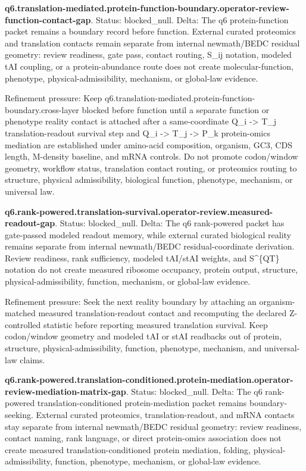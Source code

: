 \textbf{q6.translation-mediated.protein-function-boundary.operator-review-function-contact-gap}. Status: blocked\_null. Delta: The q6 protein-function packet remains a boundary record before function. External curated proteomics and translation contacts remain separate from internal newmath/BEDC residual geometry: review readiness, gate pass, contact routing, S\_ij notation, modeled tAI coupling, or a protein-abundance route does not create molecular-function, phenotype, physical-admissibility, mechanism, or global-law evidence.

Refinement pressure: Keep q6.translation-mediated.protein-function-boundary.cross-layer blocked before function until a separate function or phenotype reality contact is attached after a same-coordinate Q\_i -> T\_j translation-readout survival step and Q\_i -> T\_j -> P\_k protein-omics mediation are established under amino-acid composition, organism, GC3, CDS length, M-density baseline, and mRNA controls. Do not promote codon/window geometry, workflow status, translation contact routing, or proteomics routing to structure, physical admissibility, biological function, phenotype, mechanism, or universal law.

\textbf{q6.rank-powered.translation-survival.operator-review.measured-readout-gap}. Status: blocked\_null. Delta: The q6 rank-powered packet has gate-passed modeled readout memory, while external curated biological reality remains separate from internal newmath/BEDC residual-coordinate derivation. Review readiness, rank sufficiency, modeled tAI/stAI weights, and S\textasciicircum{}\{QT\} notation do not create measured ribosome occupancy, protein output, structure, physical-admissibility, function, mechanism, or global-law evidence.

Refinement pressure: Seek the next reality boundary by attaching an organism-matched measured translation-readout contact and recomputing the declared Z-controlled statistic before reporting measured translation survival. Keep codon/window geometry and modeled tAI or stAI readbacks out of protein, structure, physical-admissibility, function, phenotype, mechanism, and universal-law claims.

\textbf{q6.rank-powered.translation-conditioned.protein-mediation.operator-review-mediation-matrix-gap}. Status: blocked\_null. Delta: The q6 rank-powered translation-conditioned protein-mediation packet remains boundary-seeking. External curated proteomics, translation-readout, and mRNA contacts stay separate from internal newmath/BEDC residual geometry: review readiness, contact naming, rank language, or direct protein-omics association does not create measured translation-conditioned protein mediation, folding, physical-admissibility, function, phenotype, mechanism, or global-law evidence.

